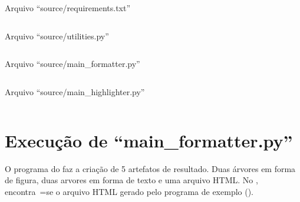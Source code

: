 \begin{code}
\caption{Arquivo ``source/requirements.txt''}
\label{requirementsTxt}
\inputminted{python3}{../source/requirements.txt}
\end{code}

\begin{code}
\caption{Arquivo ``source/utilities.py''}
\label{utilitiesPy}
\inputminted{python3}{../source/utilities.py}
\end{code}

\begin{code}
\caption{Arquivo ``source/main\_formatter.py''}
\label{MainFormatterPy}
\inputminted{python3}{../source/main_formatter.py}
\end{code}

\begin{code}
\caption{Arquivo ``source/main\_highlighter.py''}
\label{MainHighlighterPy}
\inputminted{python3}{../source/main_highlighter.py}
\end{code}


\chapter{Execução de ``main\_formatter.py''}

O programa do  faz a criação de 5 artefatos de resultado.
Duas árvores em forma de figura,
duas arvores em forma de texto e
uma arquivo HTML.
No ,
encontra~=se o arquivo HTML gerado pelo programa de exemplo ().

